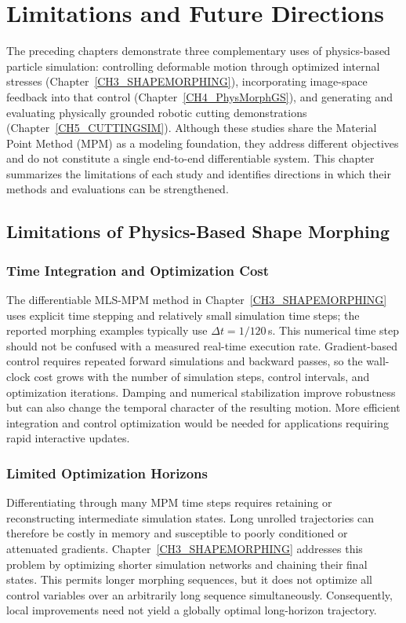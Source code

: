 
\clearpage
\chapter{Limitations and Future Directions}\label{CH6_LIMITATION}

The preceding chapters demonstrate three complementary uses of physics-based particle simulation: controlling deformable motion through optimized internal stresses (Chapter~\ref{CH3_SHAPEMORPHING}), incorporating image-space feedback into that control (Chapter~\ref{CH4_PhysMorphGS}), and generating and evaluating physically grounded robotic cutting demonstrations (Chapter~\ref{CH5_CUTTINGSIM}). Although these studies share the Material Point Method (MPM) as a modeling foundation, they address different objectives and do not constitute a single end-to-end differentiable system. This chapter summarizes the limitations of each study and identifies directions in which their methods and evaluations can be strengthened.

\section{Limitations of Physics-Based Shape Morphing}
\label{subsec:lim-mpm}

\subsection{Time Integration and Optimization Cost}
The differentiable MLS-MPM method in Chapter~\ref{CH3_SHAPEMORPHING} uses explicit time stepping and relatively small simulation time steps; the reported morphing examples typically use $\Delta t=1/120$\,s. This numerical time step should not be confused with a measured real-time execution rate. Gradient-based control requires repeated forward simulations and backward passes, so the wall-clock cost grows with the number of simulation steps, control intervals, and optimization iterations. Damping and numerical stabilization improve robustness but can also change the temporal character of the resulting motion. More efficient integration and control optimization would be needed for applications requiring rapid interactive updates.

\subsection{Limited Optimization Horizons}
Differentiating through many MPM time steps requires retaining or reconstructing intermediate simulation states. Long unrolled trajectories can therefore be costly in memory and susceptible to poorly conditioned or attenuated gradients. Chapter~\ref{CH3_SHAPEMORPHING} addresses this problem by optimizing shorter simulation networks and chaining their final states. This permits longer morphing sequences, but it does not optimize all control variables over an arbitrarily long sequence simultaneously. Consequently, local improvements need not yield a globally optimal long-horizon trajectory.

